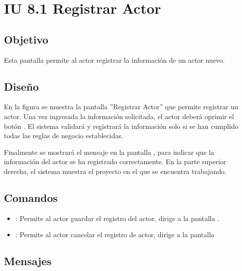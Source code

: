 \section{IU 8.1 Registrar Actor}

\subsection{Objetivo}
	Esta pantalla permite al actor registrar la información de un actor nuevo.
\subsection{Diseño}
	En la figura  se muestra la pantalla ''Registrar Actor'' que permite registrar un actor.
	Una vez ingresada la información solicitada, el actor deberá oprimir el botón  . El sistema validará y registrará la información solo si se han cumplido todas las reglas de negocio establecidas.
	
	Finalmente se mostrará el mensaje  en la pantalla , para indicar que la información del actor se ha registrado correctamente.
	En la parte superior derecha, el sistema muestra el proyecto en el que se encuentra trabajando.

\subsection{Comandos}
\begin{itemize}
	\item {}: Permite al actor guardar el registro del actor, dirige a la pantalla .
	\item {}: Permite al actor cancelar el registro de actor, dirige a la pantalla 
\end{itemize}

\subsection{Mensajes}

